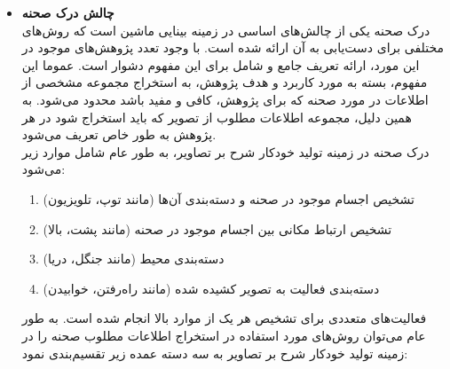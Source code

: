 \begin{itemize}
	\item \textbf{چالش درک صحنه}\\
درک صحنه یکی از چالش‌های اساسی در زمینه بینایی ماشین است که روش‌های مختلفی برای دست‌یابی به آن ارائه شده است. با وجود تعدد پژوهش‌های موجود در این مورد، ارائه تعریف جامع و شامل برای این مفهوم دشوار است. عموما این مفهوم، بسته به مورد کاربرد و هدف پژوهش، به استخراج مجموعه مشخصی از اطلاعات در مورد صحنه که برای پژوهش، کافی و مفید باشد محدود می‌شود. به همین دلیل، مجموعه اطلاعات مطلوب از تصویر که باید استخراج شود در هر پژوهش به طور خاص تعریف می‌شود.
\\
درک صحنه در زمینه تولید خودکار شرح بر تصاویر، به طور عام شامل موارد زیر می‌شود:
\begin{enumerate}
	\item تشخیص اجسام موجود در صحنه و دسته‌بندی آن‌ها (مانند توپ، تلویزیون)
	\item تشخیص ارتباط مکانی بین اجسام موجود در صحنه (مانند پشت، بالا)
	\item دسته‌بندی محیط (مانند جنگل، دریا)
	\item دسته‌بندی فعالیت به تصویر کشیده شده (مانند راه‌رفتن، خوابیدن)
\end{enumerate}

فعالیت‌های متعددی برای تشخیص هر یک از موارد بالا انجام شده است. به طور عام می‌توان روش‌های مورد استفاده در استخراج اطلاعات مطلوب صحنه را در زمینه تولید خودکار شرح بر تصاویر به سه دسته عمده زیر تقسیم‌بندی نمود:


\end{itemize}
